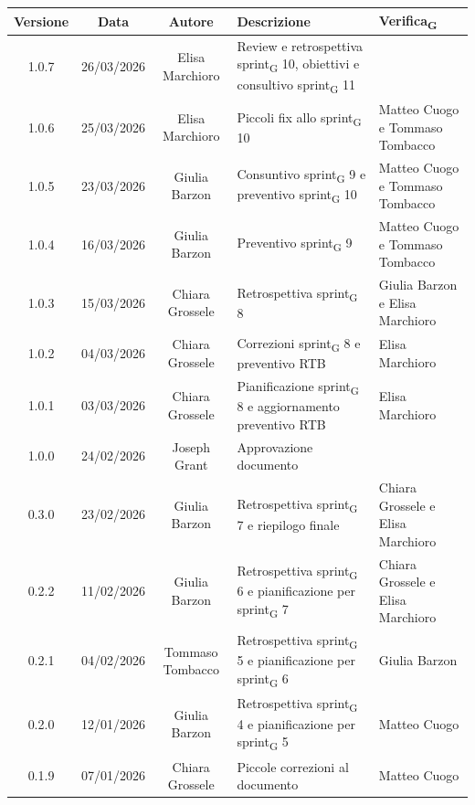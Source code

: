 \documentclass[11pt,a4paper]{article}
\newcommand{\gls}[1]{#1\textsubscript{G}}
\begin{document}
\begin{table}[H]
    \centering
    \begin{tabular}{|c|c|c|>{\raggedright\arraybackslash}p{}|p{}|}
        \hline
        \textbf{Versione} & \textbf{Data} & \textbf{Autore} & \textbf{Descrizione} & \textbf{\gls{Verifica}} \\
        \hline
        1.0.7 & 26/03/2026 & Elisa Marchioro & Review e retrospettiva \gls{sprint} 10, obiettivi e consultivo \gls{sprint} 11 & \\
        \hline
        1.0.6 & 25/03/2026 & Elisa Marchioro & Piccoli fix allo \gls{sprint} 10 & Matteo Cuogo e Tommaso Tombacco\\
        \hline
        1.0.5 & 23/03/2026 & Giulia Barzon & Consuntivo \gls{sprint} 9 e preventivo \gls{sprint} 10 & Matteo Cuogo e Tommaso Tombacco\\
        \hline
        1.0.4 & 16/03/2026 & Giulia Barzon & Preventivo \gls{sprint} 9 & Matteo Cuogo e Tommaso Tombacco\\
        \hline
        1.0.3 & 15/03/2026 & Chiara Grossele & Retrospettiva \gls{sprint} 8 & Giulia Barzon e Elisa Marchioro\\
        \hline
        1.0.2 & 04/03/2026 & Chiara Grossele & Correzioni \gls{sprint} 8 e preventivo RTB & Elisa Marchioro\\
        \hline
        1.0.1 & 03/03/2026 & Chiara Grossele & Pianificazione \gls{sprint} 8 e aggiornamento preventivo RTB & Elisa Marchioro\\
        \hline
        1.0.0 & 24/02/2026 & Joseph Grant & Approvazione documento & \\
        \hline
        0.3.0 & 23/02/2026 & Giulia Barzon & Retrospettiva \gls{sprint} 7 e riepilogo finale & Chiara Grossele e Elisa Marchioro\\
        \hline
        0.2.2 & 11/02/2026 & Giulia Barzon & Retrospettiva \gls{sprint} 6 e pianificazione per \gls{sprint} 7 & Chiara Grossele e Elisa Marchioro\\
        \hline
        0.2.1 & 04/02/2026 & Tommaso Tombacco & Retrospettiva \gls{sprint} 5 e pianificazione per \gls{sprint} 6 & Giulia Barzon\\
        \hline
        0.2.0 & 12/01/2026 & Giulia Barzon & Retrospettiva \gls{sprint} 4 e pianificazione per \gls{sprint} 5 & Matteo Cuogo\\
        \hline
        0.1.9 & 07/01/2026 & Chiara Grossele & Piccole correzioni al documento & Matteo Cuogo\\ 

\end{tabular}
\end{table}
\end{document}
